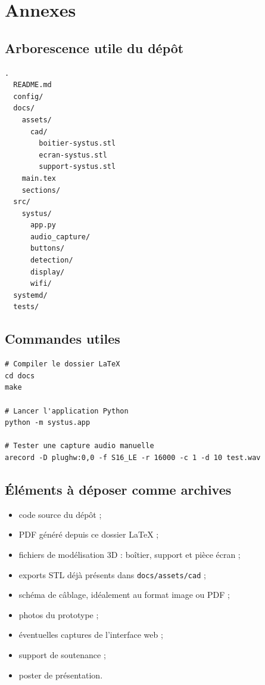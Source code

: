 \appendix
\section{Annexes}

\subsection{Arborescence utile du dépôt}

\begin{lstlisting}
.
  README.md
  config/
  docs/
    assets/
      cad/
        boitier-systus.stl
        ecran-systus.stl
        support-systus.stl
    main.tex
    sections/
  src/
    systus/
      app.py
      audio_capture/
      buttons/
      detection/
      display/
      wifi/
  systemd/
  tests/
\end{lstlisting}

\subsection{Commandes utiles}

\begin{lstlisting}
# Compiler le dossier LaTeX
cd docs
make

# Lancer l'application Python
python -m systus.app

# Tester une capture audio manuelle
arecord -D plughw:0,0 -f S16_LE -r 16000 -c 1 -d 10 test.wav
\end{lstlisting}

\subsection{Éléments à déposer comme archives}

\begin{itemize}
    \item code source du dépôt ;
    \item PDF généré depuis ce dossier LaTeX ;
    \item fichiers de modélisation 3D : boîtier, support et pièce écran ;
    \item exports STL déjà présents dans \texttt{docs/assets/cad} ;
    \item schéma de câblage, idéalement au format image ou PDF ;
    \item photos du prototype ;
    \item éventuelles captures de l'interface web ;
    \item support de soutenance ;
    \item poster de présentation.
\end{itemize}

